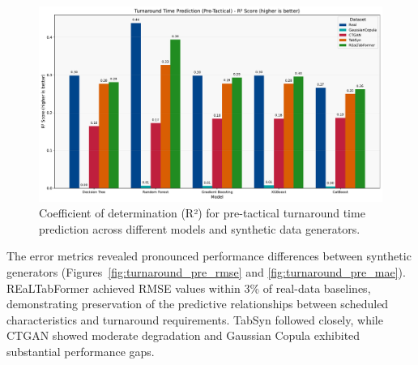 \documentclass[conference]{IEEEtran}
\begin{document}
\begin{figure}[htbp]
    \centering
    \includegraphics[width=\linewidth]{plots/turnaround_min_pre-tactical/turnaround_min_pre-tactical_r2.pdf}
    \caption{Coefficient of determination (R²) for pre-tactical turnaround time prediction across different models and synthetic data generators.}
    \label{fig:turnaround_pre_r2}
\end{figure}

The error metrics revealed pronounced performance differences between synthetic generators (Figures~\ref{fig:turnaround_pre_rmse} and \ref{fig:turnaround_pre_mae}). REaLTabFormer achieved RMSE values within 3\% of real-data baselines, demonstrating preservation of the predictive relationships between scheduled characteristics and turnaround requirements. TabSyn followed closely, while CTGAN showed moderate degradation and Gaussian Copula exhibited substantial performance gaps.
\end{document}
